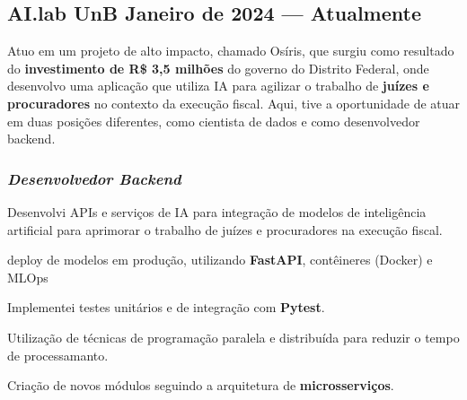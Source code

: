 \documentclass[a4paper,12pt]{article}
\begin{document}



\subsection*{\large AI.lab UnB \hfill Janeiro de 2024 --- Atualmente}


Atuo em um projeto de alto impacto, chamado Osíris, que surgiu como resultado do \textbf{investimento de R\$ 3,5
milhões} do governo do Distrito Federal, onde desenvolvo uma aplicação que utiliza IA
para agilizar o trabalho de \textbf{juízes e procuradores} no contexto da execução fiscal. Aqui, tive a oportunidade
de atuar em duas posições diferentes, como cientista de dados e como desenvolvedor backend.

\vspace{0.5em}

\vspace{1em}

\subsubsection*{\small \textit{Desenvolvedor Backend} }
\vspace{-1em}
\vspace{-0.5em}
\begin{zitemize}
    \item Desenvolvi APIs e serviços de IA para integração de modelos de inteligência artificial para aprimorar o trabalho de juízes e procuradores na execução fiscal.
    \item deploy de modelos em produção, utilizando  \textbf{FastAPI}, contêineres (Docker) e MLOps
    \item Implementei testes unitários e de integração com \textbf{Pytest}.
    \item Utilização de técnicas de programação paralela e distribuída para reduzir o tempo de processamanto.
    \item Criação de novos módulos seguindo a arquitetura de \textbf{microsserviços}.
\end{zitemize}
\end{document}
